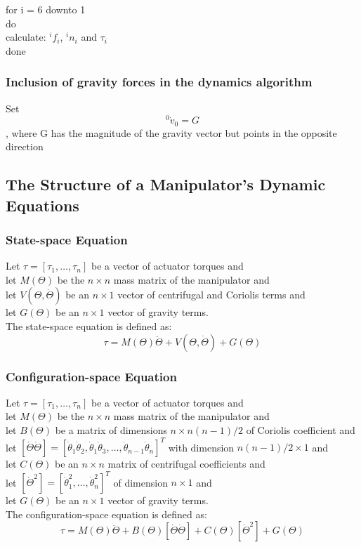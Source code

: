 \documentclass[10pt,a4paper]{article}
\newcommand{\tab}[1][1]{\hspace*{#1cm}}
\begin{document}
for i = 6 downto 1\\ 
do \\
\tab	calculate: $^if_i$, $^in_i$ and $\tau_i$ \\
done \\

\subsubsection{Inclusion of gravity forces in the dynamics algorithm}
Set 
$$
	^0\dot v_0 = G
$$
, where G has the magnitude of the gravity vector but points in the opposite direction 

\subsection{The Structure of a Manipulator's Dynamic Equations}
\subsubsection{State-space Equation}
Let $\tau = [\tau_1, \dots, \tau_n]$ be a vector of actuator torques and \\
let $M(\Theta)$ be the $n \times n$ mass matrix of the manipulator and \\
let $V(\Theta, \dot{\Theta})$ be an $n \times 1$ vector of centrifugal and Coriolis terms and \\
let $G(\Theta)$ be an $n \times 1$ vector of gravity terms. \\
The state-space equation is defined as: \\
$$
	\tau = M(\Theta)\ddot{\Theta} + V(\Theta, \dot{\Theta}) + G(\Theta)
$$

\subsubsection{Configuration-space Equation}
Let $\tau = [\tau_1, \dots, \tau_n]$ be a vector of actuator torques and \\
let $M(\Theta)$ be the $n \times n$ mass matrix of the manipulator and \\
let $B(\Theta)$ be a matrix of dimensions $n \times n(n-1)/2$ of Coriolis coefficient and \\
let $[\dot{\Theta}\dot{\Theta}] = [\dot \theta_1 \dot \theta_2, \dot \theta_1 \dot \theta_3, \dots, \dot \theta_{n-1}\dot \theta_n]^T$ with dimension $n(n-1)/2 \times 1$ and \\
let $C(\Theta)$ be an $n \times n$ matrix of centrifugal coefficients and \\
let $[\dot \Theta^2] = [\dot \theta_1^2, \dots, \dot \theta_n^2]^T$ of dimension $n \times 1$ and \\
let $G(\Theta)$ be an $n \times 1$ vector of gravity terms. \\
The configuration-space equation is defined as: \\
$$
	\tau = M(\Theta)\ddot \Theta + B(\Theta)[\dot \Theta \dot \Theta] + C(\Theta)[\dot \Theta^2] + G(\Theta)
$$
\end{document}
